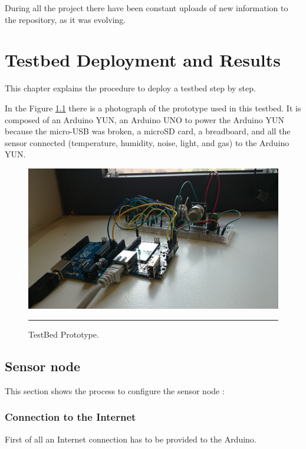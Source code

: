 \documentclass[12pt, a4paper,twoside]{tesi_upf}
\begin{document}
		During all the project there have been constant uploads of new information to the repository, as it was evolving.


\chapter{Testbed Deployment and Results}
\label{Chapter5}

  This chapter explains the procedure to deploy a testbed step by step.
  
  In the Figure \ref{fig:TestBed_Prototype} there is a photograph of the prototype used in this testbed. It is composed of an Arduino YUN, an Arduino UNO to power the Arduino YUN because the micro-USB was broken, a microSD card, a breadboard, and all the sensor connected (temperature, humidity, noise, light, and gas) to the Arduino YUN.
  
  \begin{figure}[htbp]
      \centering
          \includegraphics[scale=0.1]{./Figures/TestBed_Prototype.JPG}
          \rule{35em}{0.5pt}
      \caption[TestBed Prototype]{TestBed Prototype.}
      \label{fig:TestBed_Prototype}
  \end{figure} 
  
  \section{Sensor node}
  
  	This section shows the process to configure the sensor node \cite{guideArduinoYun}:
  
  \subsection{Connection to the Internet}
    First of all an Internet connection has to be provided to the Arduino.
\end{document}
